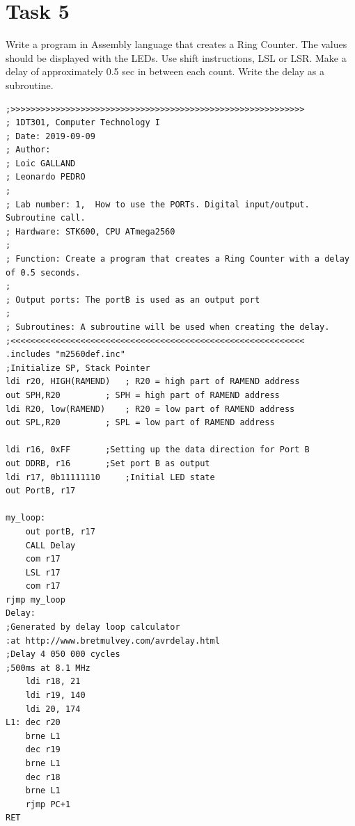 \documentclass[a4paper,12pt]{article}
\begin{document}
\section{Task 5}
Write a program in Assembly language that creates a Ring Counter. The values should be
displayed with the LEDs. Use shift instructions, LSL or LSR.
Make a delay of approximately 0.5 sec in between each count. Write the delay as a
subroutine.
\lstset{style=Asm}
\begin{lstlisting}
;>>>>>>>>>>>>>>>>>>>>>>>>>>>>>>>>>>>>>>>>>>>>>>>>>>>>>>>>>>>
; 1DT301, Computer Technology I
; Date: 2019-09-09
; Author:
; Loic GALLAND
; Leonardo PEDRO
;
; Lab number: 1,  How to use the PORTs. Digital input/output. Subroutine call.
; Hardware: STK600, CPU ATmega2560
;
; Function: Create a program that creates a Ring Counter with a delay of 0.5 seconds. 
;
; Output ports: The portB is used as an output port
;
; Subroutines: A subroutine will be used when creating the delay. 
;<<<<<<<<<<<<<<<<<<<<<<<<<<<<<<<<<<<<<<<<<<<<<<<<<<<<<<<<<<<
.includes "m2560def.inc"
;Initialize SP, Stack Pointer
ldi r20, HIGH(RAMEND)	; R20 = high part of RAMEND address
out SPH,R20 		; SPH = high part of RAMEND address
ldi R20, low(RAMEND) 	; R20 = low part of RAMEND address
out SPL,R20 		; SPL = low part of RAMEND address

ldi r16, 0xFF 		;Setting up the data direction for Port B
out DDRB, r16 		;Set port B as output
ldi r17, 0b11111110 	;Initial LED state
out PortB, r17

my_loop:
	out portB, r17
	CALL Delay
	com r17
	LSL r17
	com r17
rjmp my_loop
Delay:
;Generated by delay loop calculator
:at http://www.bretmulvey.com/avrdelay.html
;Delay 4 050 000 cycles
;500ms at 8.1 MHz
	ldi r18, 21
	ldi r19, 140
	ldi 20, 174
L1:	dec r20
	brne L1
	dec r19
	brne L1
	dec r18
	brne L1
	rjmp PC+1
RET
\end{lstlisting}
\newpage

\newpage
\end{document}
